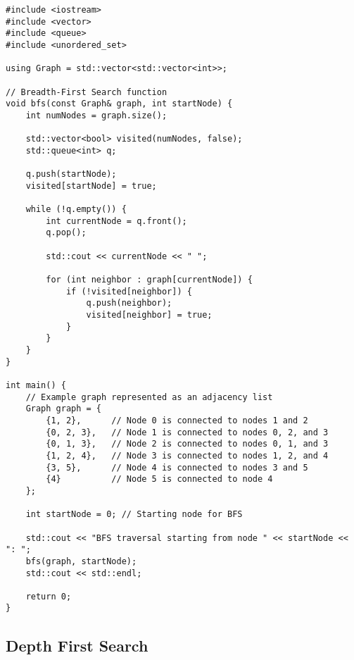 \begin{verbatim}
#include <iostream>
#include <vector>
#include <queue>
#include <unordered_set>

using Graph = std::vector<std::vector<int>>;

// Breadth-First Search function
void bfs(const Graph& graph, int startNode) {
    int numNodes = graph.size();

    std::vector<bool> visited(numNodes, false);
    std::queue<int> q;

    q.push(startNode);
    visited[startNode] = true;

    while (!q.empty()) {
        int currentNode = q.front();
        q.pop();

        std::cout << currentNode << " ";

        for (int neighbor : graph[currentNode]) {
            if (!visited[neighbor]) {
                q.push(neighbor);
                visited[neighbor] = true;
            }
        }
    }
}

int main() {
    // Example graph represented as an adjacency list
    Graph graph = {
        {1, 2},      // Node 0 is connected to nodes 1 and 2
        {0, 2, 3},   // Node 1 is connected to nodes 0, 2, and 3
        {0, 1, 3},   // Node 2 is connected to nodes 0, 1, and 3
        {1, 2, 4},   // Node 3 is connected to nodes 1, 2, and 4
        {3, 5},      // Node 4 is connected to nodes 3 and 5
        {4}          // Node 5 is connected to node 4
    };

    int startNode = 0; // Starting node for BFS

    std::cout << "BFS traversal starting from node " << startNode << ": ";
    bfs(graph, startNode);
    std::cout << std::endl;

    return 0;
}
\end{verbatim}

\subsection{Depth First Search}

